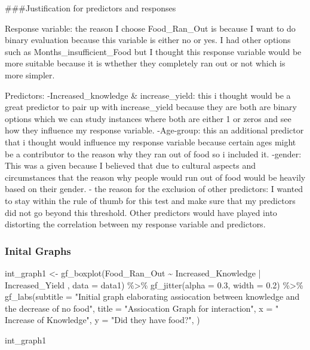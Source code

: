 \documentclass[
]{article}
\newenvironment{Shaded}{\begin{snugshade}}{\end{snugshade}}
\newcommand{\AttributeTok}[1]{\textcolor[rgb]{0.77,0.63,0.00}{#1}}
\newcommand{\FloatTok}[1]{\textcolor[rgb]{0.00,0.00,0.81}{#1}}
\newcommand{\FunctionTok}[1]{\textcolor[rgb]{0.00,0.00,0.00}{#1}}
\newcommand{\NormalTok}[1]{#1}
\newcommand{\OtherTok}[1]{\textcolor[rgb]{0.56,0.35,0.01}{#1}}
\newcommand{\SpecialCharTok}[1]{\textcolor[rgb]{0.00,0.00,0.00}{#1}}
\newcommand{\StringTok}[1]{\textcolor[rgb]{0.31,0.60,0.02}{#1}}
\begin{document}
\#\#\#Justification for predictors and responses

Response variable: the reason I choose Food\_Ran\_Out is because I want
to do binary evaluation because this variable is either no or yes. I had
other options such as Months\_insufficient\_Food but I thought this
response variable would be more suitable because it is wthether they
completely ran out or not which is more simpler.

Predictors: -Increased\_knowledge \& increase\_yield: this i thought
would be a great predictor to pair up with increase\_yield because they
are both are binary options which we can study instances where both are
either 1 or zeros and see how they influence my response variable.
-Age-group: this an additional predictor that i thought would influence
my response variable because certain ages might be a contributor to the
reason why they ran out of food so i included it. -gender: This was a
given because I believed that due to cultural aspects and circumstances
that the reason why people would run out of food would be heavily based
on their gender. - the reason for the exclusion of other predictors: I
wanted to stay within the rule of thumb for this test and make sure that
my predictors did not go beyond this threshold. Other predictors would
have played into distorting the correlation between my response variable
and predictors.

\hypertarget{inital-graphs}{%
\subsubsection{Inital Graphs}\label{inital-graphs}}

\begin{Shaded}
\begin{Highlighting}[]
\NormalTok{int\_graph1 }\OtherTok{\textless{}{-}} \FunctionTok{gf\_boxplot}\NormalTok{(Food\_Ran\_Out }\SpecialCharTok{\textasciitilde{}}\NormalTok{ Increased\_Knowledge }\SpecialCharTok{|}\NormalTok{ Increased\_Yield ,  }\AttributeTok{data =}\NormalTok{ data1) }\SpecialCharTok{\%\textgreater{}\%}
  \FunctionTok{gf\_jitter}\NormalTok{(}\AttributeTok{alpha =} \FloatTok{0.3}\NormalTok{, }\AttributeTok{width =} \FloatTok{0.2}\NormalTok{) }\SpecialCharTok{\%\textgreater{}\%}
   \FunctionTok{gf\_labs}\NormalTok{(}\AttributeTok{subtitle =} \StringTok{"Initial graph elaborating assiocation between knowledge and the decrease of no food"}\NormalTok{,}
          \AttributeTok{title =} \StringTok{"Assiocation Graph for interaction"}\NormalTok{,}
          \AttributeTok{x =} \StringTok{" Increase of Knowledge"}\NormalTok{,}
          \AttributeTok{y =} \StringTok{"Did they have food?"}\NormalTok{, }
\NormalTok{           )}

\NormalTok{int\_graph1}
\end{Highlighting}
\end{Shaded}
\end{document}
